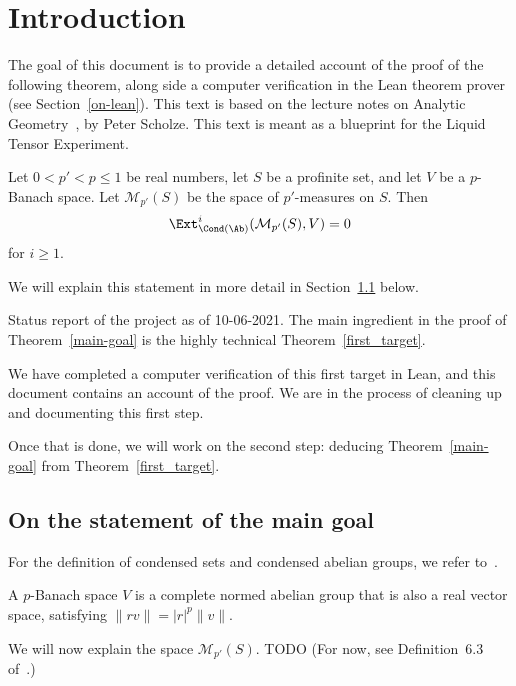 \section{Introduction}
\label{intro}

The goal of this document is to provide a detailed account
of the proof of the following theorem,
along side a computer verification in the Lean theorem prover
(see Section~\ref{on-lean}).
This text is based on the lecture notes on Analytic Geometry~\cite{Analytic},
by Peter Scholze.
This text is meant as a blueprint for the Liquid Tensor Experiment.

\begin{theoremx}
  \label{main-goal}
  Let $0 < p' < p \le 1$ be real numbers,
  let $S$ be a profinite set,
  and let $V$ be a $p$-Banach space.
  Let $\mathcal M_{p'}(S)$ be the space of $p'$-measures on $S$.
  Then
  \[
    \Ext^i_{\Cond(\Ab)}(\mathcal M_{p'}(S), V)=0
  \]
  for $i \ge 1$.
\end{theoremx}

We will explain this statement in more detail in Section~\ref{on-the-statement} below.

\begin{remark}
  Status report of the project as of 10-06-2021.
  The main ingredient in the proof of Theorem~\ref{main-goal}
  is the highly technical Theorem~\ref{first_target}.

  We have completed a computer verification of this first target in Lean,
  and this document contains an account of the proof.
  We are in the process of cleaning up and documenting this first step.

  Once that is done, we will work on the second step:
  deducing Theorem~\ref{main-goal} from Theorem~\ref{first_target}.
\end{remark}

\subsection{On the statement of the main goal}
\label{on-the-statement}

For the definition of condensed sets and condensed abelian groups,
we refer to~\cite{Condensed}.

A $p$-Banach space $V$ is a complete normed abelian group
that is also a real vector space,
satisfying $\|rv\| = |r|^p\|v\|$.

We will now explain the space $\mathcal M_{p'}(S)$.
TODO
(For now, see Definition~6.3 of~\cite{Analytic}.)

